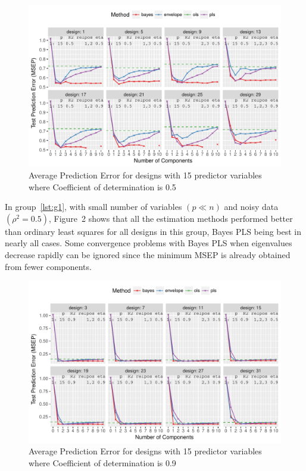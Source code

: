 \documentclass[num-refs]{wiley-article}
\begin{document}
\begin{figure}[!ht]
\centering
\includegraphics[width = \textwidth]{prediction-error-15-1.pdf}
\caption[Prediction Error - 1]{Average Prediction Error for designs with 15 predictor
variables where Coefficient of determination is 0.5}
\label{fig:pred-error-15-1}
\end{figure}

In group~\ref{lst:g1}, with small number of variables $(p \ll n)$ and noisy data
$(\rho^2 = 0.5)$, Figure~2 shows that all the estimation
methods performed better than ordinary least squares for all designs in this
group, Bayes PLS being best in nearly all cases. Some convergence problems with Bayes PLS when eigenvalues decrease rapidly
can be ignored since the minimum MSEP is already obtained from fewer components.


\begin{figure}[!ht]
\centering
\includegraphics[width = \textwidth]{prediction-error-15-2.pdf}
\caption[Prediction Error - 2]{Average Prediction Error for designs with 15 predictor
variables where Coefficient of determination is 0.9}
\label{fig:pred-error-15-2}
\end{figure}
\end{document}
